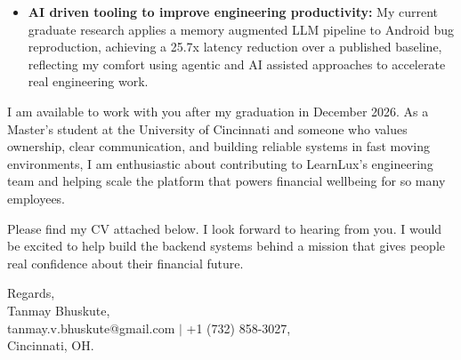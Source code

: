 \documentclass[11pt]{letter}
\begin{document}
\begin{letter}{}
\begin{itemize}[leftmargin=*, itemsep=0.45em]
    \item \textbf{AI driven tooling to improve engineering productivity:} My current graduate research applies a memory augmented LLM pipeline to Android bug reproduction, achieving a 25.7x latency reduction over a published baseline, reflecting my comfort using agentic and AI assisted approaches to accelerate real engineering work.
\end{itemize}

I am available to work with you after my graduation in December 2026. As a Master's student at the University of Cincinnati and someone who values ownership, clear communication, and building reliable systems in fast moving environments, I am enthusiastic about contributing to LearnLux's engineering team and helping scale the platform that powers financial wellbeing for so many employees.

Please find my CV attached below. I look forward to hearing from you. I would be excited to help build the backend systems behind a mission that gives people real confidence about their financial future.

{\setlength{\parskip}{0pt}
Regards,\\
Tanmay Bhuskute,\\
tanmay.v.bhuskute@gmail.com $\mid$ +1 (732) 858-3027,\\
Cincinnati, OH.
}

\end{letter}
\end{document}
